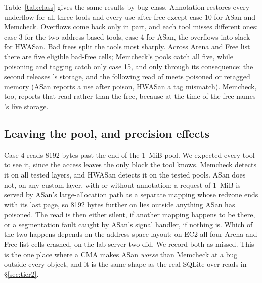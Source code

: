 \begin{table}[!htbp]
\centering\small
\setlength{\tabcolsep}{4.2pt}

\caption{Bugs detected out of eligible bugs by class. CMA = Arena and Free list together, without
(CMA) and with (CMA+A) annotation. SQLite memsys5 gives the same verdict as the Free list in every cell.}
\label{tab:class}
\end{table}

Table~\ref{tab:class} gives the same results by bug class. Annotation restores every underflow for all three tools and every use after free except case 10 for ASan and Memcheck. Overflows come back only in part, and each tool misses different ones: case 3 for the two address-based tools, case 4 for ASan, the overflows into slack for HWASan. Bad frees split the tools most sharply. Across Arena and Free list there are five eligible bad-free cells; Memcheck's pools catch all five, while poisoning and tagging catch only case 15, and only through its consequence: the second  releases 's storage, and the following read of  meets poisoned or retagged memory (ASan reports a use after poison, HWASan a tag mismatch). Memcheck, too, reports that read rather than the free, because at the time of the free  names 's live storage.

\subsection{Leaving the pool, and precision effects}
\label{sec:q1-precision}

Case 4 reads 8192 bytes past the end of the 1~MiB pool. We expected every tool to see it, since the access leaves the only block the tool knows. Memcheck detects it on all tested layers, and HWASan detects it on the tested pools. ASan does not, on any custom layer, with or without annotation: a request of 1~MiB is served by ASan's large-allocation path as a separate mapping whose redzone ends with its last page, so 8192 bytes further on lies outside anything ASan has poisoned. The read is then either silent, if another mapping happens to be there, or a segmentation fault caught by ASan's signal handler, if nothing is. Which of the two happens depends on the address-space layout: on EC2 all four Arena and Free list cells crashed, on the lab server two did. We record both as missed. This is the one place where a CMA makes ASan \emph{worse} than Memcheck at a bug outside every object, and it is the same shape as the real SQLite over-reads in \S\ref{sec:tier2}.

